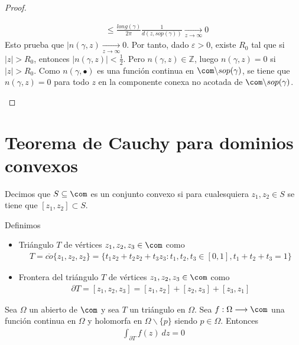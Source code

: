 \begin{proof}
\begin{enumerate}
\begin{align*}
        & \leq \frac{long(\gamma)}{2\pi} \frac{1}{d(z,sop(\gamma))} \xrightarrow[z \to \infty]{} 0
    \end{align*}
    Esto prueba que $|n(\gamma,z) \xrightarrow[z \to \infty]{} 0$. Por tanto, dado $\varepsilon > 0$, existe $R_0$ tal que si $|z| > R_0$, entonces $|n(\gamma,z)| < \frac{1}{2}$. Pero $n(\gamma,z) \in \mathbb{Z}$, luego $n(\gamma,z) = 0$ si $|z| > R_0$. Como  $n(\gamma, \bullet)$ es una función continua en $\com \backslash sop(\gamma)$, se tiene que $n(\gamma,z) = 0$ para todo $z$ en la componente conexa no acotada de $\com \backslash sop(\gamma)$.
\end{enumerate}
\end{proof}

\section{Teorema de Cauchy para dominios convexos}

\begin{defi}
Decimos que $S \subseteq \com$ es un conjunto convexo si para cualesquiera $z_1,z_2 \in S$ se tiene que $[z_1,z_2] \subset S$.
\end{defi}

\begin{defi}
Definimos
\begin{itemize}
    \item Triángulo $T$ de vértices $z_1,z_2,z_3 \in \com$ como
    \begin{align*}
        T = \overline{co}\{z_1,z_2,z_2\} = \{ t_1z_2 + t_2z_2 + t_3z_3 : t_1,t_2,t_3 \in [0,1], t_1 + t_2 + t_3 = 1\}
    \end{align*}
    \item Frontera del triángulo $T$ de vértices $z_1,z_2,z_3 \in \com$ como
    \begin{align*}
        \partial T = [z_1,z_2,z_3] = [z_1,z_2] + [z_2,z_3] + [z_3,z_1]
    \end{align*}
\end{itemize}
\end{defi}

\begin{teo}
Sea $\Omega$ un abierto de $\com$ y sea $T$ un triángulo en $\Omega$. Sea $f: \Omega \longrightarrow \com$ una función continua en $\Omega$ y holomorfa en $\Omega \backslash \{p\}$ siendo $p \in \Omega$. Entonces
\begin{align*}
    \int_{\partial T}{f(z) \ dz} = 0
\end{align*}
\end{teo}

